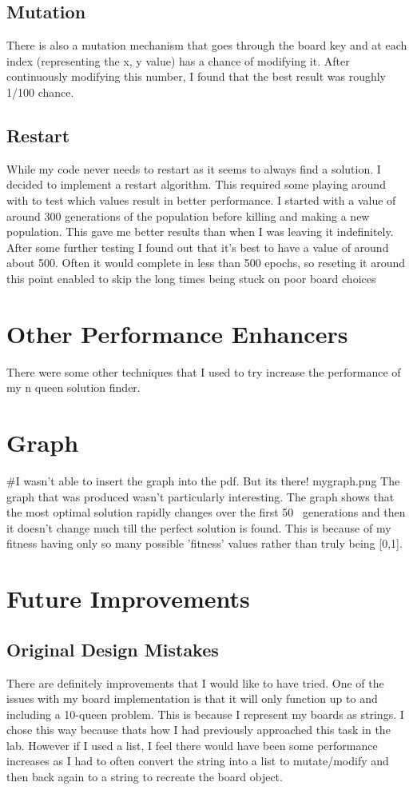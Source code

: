 \documentclass[a4paper,11pt]{article}
\begin{document}
\subsection*{Mutation}
There is also a mutation mechanism that goes through the board key and at each index (representing the x, y value) has a chance of modifying it. After continuously modifying this number, I found that the best result was roughly 1/100 chance.

\subsection*{Restart}
While my code never needs to restart as it seems to always find a solution. I decided to implement a restart algorithm. This required some playing around with to test which values result in better performance.
I started with a value of around 300 generations of the population before killing and making a new population. This gave me better results than when I was leaving it indefinitely.
After some further testing I found out that it's best to have a value of around
about 500. Often it would complete in less than 500 epochs, so reseting it around this point enabled to skip the long times being stuck on poor board choices


\section*{Other Performance Enhancers}
There were some other techniques that I used to try increase the performance of my n queen solution finder.

\section*{Graph}
#I wasn't able to insert the graph into the pdf. But its there! mygraph.png
The graph that was produced wasn't particularly interesting. The graph shows that the most optimal solution rapidly changes over the first 50~ generations and then it doesn't change much till the perfect solution is found. This is because of my fitness having only so many possible 'fitness' values rather than truly being [0,1].

\section*{Future Improvements}
\subsection*{Original Design Mistakes}
There are definitely improvements that I would like to have tried. One of the issues with my board implementation is that it will only function up to and including a 10-queen problem. This is because I represent my boards as strings. I chose this way because thats how I had previously approached this task in the lab. However if I used a list, I feel there would have been some performance increases as I had to often convert the string into a list to mutate/modify and then back again to a string to recreate the board object.
\end{document}
